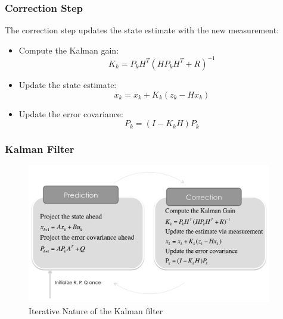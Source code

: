\documentclass{beamer}
\begin{document}
\begin{frame}
    \frametitle{Correction Step}
    The correction step updates the state estimate with the new measurement:
    \begin{itemize}
        \item Compute the Kalman gain:
              \begin{equation}
                  K_{k} = P_{k}H^{T}(HP_{k}H^{T}+R)^{-1}
              \end{equation}
        \item Update the state estimate:
              \begin{equation}
                  x_{k} = x_{k}+K_{k}(z_{k}-Hx_{k})
              \end{equation}
        \item Update the error covariance:
              \begin{equation}
                  P_{k} = (I-K_{k}H)P_{k}
              \end{equation}
    \end{itemize}
\end{frame}

\begin{frame}
    \frametitle{Kalman Filter}
    \begin{figure}
        \centering
        \includegraphics[width=0.95\textwidth]{images/06_kalman_diagram.png}
        \caption{Iterative Nature of the Kalman filter}
    \end{figure}
\end{frame}
\end{document}
